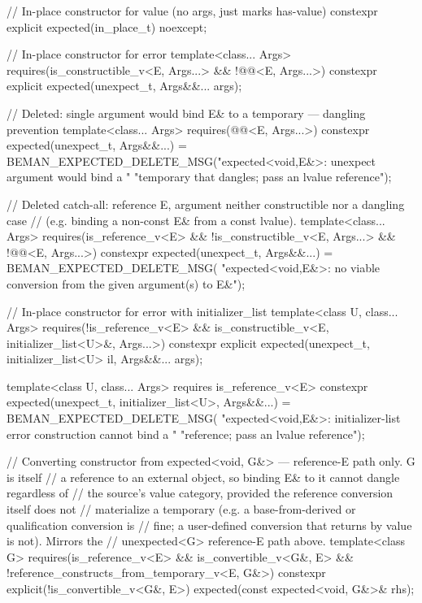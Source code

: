 \begin{codeblock}
{  // In-place constructor for value (no args, just marks has-value)
  constexpr explicit expected(in_place_t) noexcept;

  // In-place constructor for error
  template<class... Args>
    requires(is_constructible_v<E, Args...> && !@@<E, Args...>)
  constexpr explicit expected(unexpect_t, Args&&... args);

  // Deleted: single argument would bind E& to a temporary — dangling prevention
  template<class... Args>
    requires(@@<E, Args...>)
  constexpr expected(unexpect_t, Args&&...) =
      BEMAN_EXPECTED_DELETE_MSG("expected<void,E&>: unexpect argument would bind a "
                                "temporary that dangles; pass an lvalue reference");

  // Deleted catch-all: reference E, argument neither constructible nor a dangling case
  // (e.g. binding a non-const E& from a const lvalue).
  template<class... Args>
    requires(is_reference_v<E> && !is_constructible_v<E, Args...> &&
             !@@<E, Args...>)
  constexpr expected(unexpect_t, Args&&...) = BEMAN_EXPECTED_DELETE_MSG(
      "expected<void,E&>: no viable conversion from the given argument(s) to E&");

  // In-place constructor for error with initializer_list
  template<class U, class... Args>
    requires(!is_reference_v<E> && is_constructible_v<E, initializer_list<U>&, Args...>)
  constexpr explicit expected(unexpect_t, initializer_list<U> il, Args&&... args);

  template<class U, class... Args>
    requires is_reference_v<E>
  constexpr expected(unexpect_t, initializer_list<U>, Args&&...) =
      BEMAN_EXPECTED_DELETE_MSG(
          "expected<void,E&>: initializer-list error construction cannot bind a "
          "reference; pass an lvalue reference");

  // Converting constructor from expected<void, G&> — reference-E path only. G is itself
  // a reference to an external object, so binding E& to it cannot dangle regardless of
  // the source's value category, provided the reference conversion itself does not
  // materialize a temporary (e.g. a base-from-derived or qualification conversion is
  // fine; a user-defined conversion that returns by value is not). Mirrors the
  // unexpected<G> reference-E path above.
  template<class G>
    requires(is_reference_v<E> && is_convertible_v<G&, E> &&
             !reference_constructs_from_temporary_v<E, G&>)
  constexpr explicit(!is_convertible_v<G&, E>) expected(const expected<void, G&>& rhs);

}
\end{codeblock}
